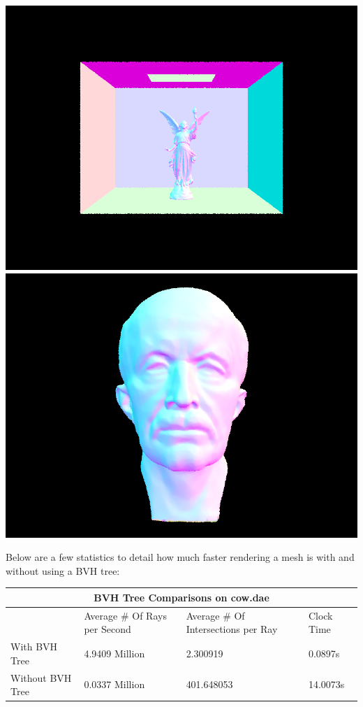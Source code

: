 \documentclass{article}
\begin{document}
\begin{center}
    \includegraphics[width=\textwidth]{task2/CBlucy.png}
    \includegraphics[width=\textwidth]{task2/maxplanck.png}
\end{center}
Below are a few statistics to detail how much faster rendering a mesh is with and without using a BVH tree:
\\
\begin{tabular}{ |p{3cm}||p{3cm}|p{3cm}|p{3cm}|  }
 \hline
 \multicolumn{4}{|c|}{BVH Tree Comparisons on cow.dae} \\
 \hline
 &  Average \# Of Rays per Second &Average \# Of Intersections per Ray & Clock Time\\
 \hline
 With BVH Tree   & 4.9409 Million    &2.300919 & 0.0897s\\
 Without BVH Tree&   0.0337 Million  & 401.648053 & 14.0073s\\
 \hline
\end{tabular}
\end{document}
